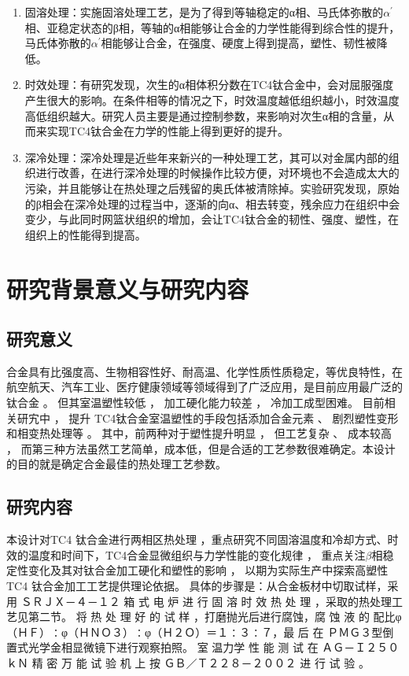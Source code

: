 \begin{enumerate}
	\item 固溶处理：实施固溶处理工艺，是为了得到等轴稳定的α相、马氏体弥散的$ α^{'} $相、亚稳定状态的β相，等轴的α相能够让合金的力学性能得到综合性的提升，马氏体弥散的$ α^{'} $相能够让合金，在强度、硬度上得到提高，塑性、韧性被降低\cite{gurong2002}。
	\item 时效处理：有研究\cite{timing}发现，次生的α相体积分数在TC4钛合金中，会对屈服强度产生很大的影响。在条件相等的情况之下，时效温度越低组织越小，时效温度高低组织越大。研究人员主要是通过控制参数，来影响对次生α相的含量，从而来实现TC4钛合金在力学的性能上得到更好的提升。
	\item 深冷处理：深冷处理是近些年来新兴的一种处理工艺，其可以对金属内部的组织进行改善，在进行深冷处理的时候操作比较方便，对环境也不会造成太大的污染，并且能够让在热处理之后残留的奥氏体被清除掉。实验研究发现，原始的β相会在深冷处理的过程当中，逐渐的向α、相去转变，残余应力在组织中会变少，与此同时网篮状组织的增加，会让TC4钛合金的韧性、强度、塑性，在组织上的性能得到提高。
\end{enumerate}

\section{研究背景意义与研究内容}
\subsection{研究意义}
\ti 合金具有比强度高、生物相容性好、耐高温、化学性质性质稳定，等优良特性，在航空航天、汽车工业、医疗健康领域等领域得到了广泛应用，是目前应用最广泛的钛合金 。 但其室温塑性较低 ， 加工硬化能力较差 ， 冷加工成型困难。 目前相关研宄中 ， 提升 TC4钛合金室温塑性的手段包括添加合金元素 、 剧烈塑性变形和相变热处理等 。 其中，前两种对于塑性提升明显 ， 但工艺复杂 、 成本较高\cite{miao} ， 而第三种方法虽然工艺简单，成本低，但是合适的工艺参数很难确定。本设计的目的就是确定\ti 合金最佳的热处理工艺参数。
\subsection{研究内容}
本设计对TC4 钛合金进行两相区热处理 ，重点研究不同固溶温度和冷却方式、时效的温度和时间下，TC4合金显微组织与力学性能的变化规律 ， 重点关注$ \beta  $相稳定性变化及其对钛合金加工硬化和塑性的影响 ， 以期为实际生产中探索高塑性 TC4 钛合金加工工艺提供理论依据。
具体的步骤是：从\ti 合金板材中切取试样，采用 ＳＲＪＸ－４－１２ 箱 式 电 炉 进 行 固 溶 时 效 热 处 理 ，采取的热处理工艺见第二节。 将 热 处 理 好 的 试 样 ，打磨抛光后进行腐蚀，腐 蚀 液 的 配比φ（ＨＦ）∶φ（ＨＮＯ３）∶φ（Ｈ２Ｏ）＝１∶３∶７，最 后 在 ＰＭＧ３型倒置式光学金相显微镜下进行观察拍照。 室 温力学 性 能 测 试 在 ＡＧ－Ｉ２５０ｋＮ 精 密 万 能 试 验 机 上 按 ＧＢ／Ｔ２２８－２００２ 进 行 试 验 。
